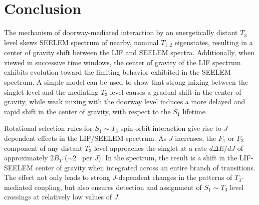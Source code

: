 





























\section{Conclusion}

The mechanism of doorway-mediated interaction by an energetically
distant $T_3$ level skews SEELEM spectrum of nearby, nominal $T_{1,2}$
eigenstates, resulting in a center of gravity shift between the LIF
and SEELEM spectra.  Additionally, when viewed in successive time
windows, the center of gravity of the LIF spectrum exhibits evolution
toward the limiting behavior exhibited in the SEELEM spectrum.  A
simple model can be used to show that strong mixing between the
singlet level and the mediating $T_3$ level causes a gradual shift in
the center of gravity, while weak mixing with the doorway level
induces a more delayed and rapid shift in the center of gravity, with
respect to the $S_1$ lifetime.

Rotational selection rules for $S_1 \sim T_3$ spin-orbit interaction
give rise to $J$-dependent effects in the LIF/SEELEM spectrum.  As $J$
increases, the $F_1$ or $F_3$ component of any distant $T_3$ level
approaches the singlet at a rate $d\Delta E / dJ$ of approximately
$2B_T$ ($\sim$2 \rcm\ per $J$).  In the spectrum, the result is a
shift in the LIF-SEELEM center of gravity when integrated across an
entire branch of transitions.  The effect not only leads to strong
$J$-dependent changes in the patterns of $T_3$-mediated coupling, but
also ensures detection and assignment of $S_1 \sim T_3$ level
crossings at relatively low values of $J$.

